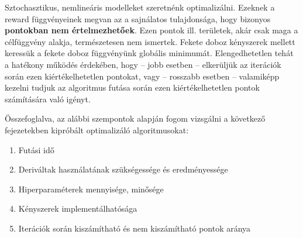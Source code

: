 Sztochasztikus, nemlineáris modelleket szeretnénk optimalizálni. Ezeknek a reward függvényeinek megvan az a sajnálatos tulajdonsága, hogy bizonyos \textbf{pontokban nem értelmezhetőek}. Ezen pontok ill. területek, akár csak maga a célfüggvény alakja, természetesen nem ismertek. Fekete doboz kényszerek mellett keressük a fekete doboz függvényünk globális minimumát. Elengedhetetlen tehát a hatékony működés érdekében, hogy -- jobb esetben -- elkerüljük az iterációk során ezen kiértékelhetetlen pontokat, vagy -- rosszabb esetben -- valamiképp kezelni tudjuk az algoritmus futása során ezen kiértékelhetetlen pontok számítására való igényt.

Összefoglalva, az alábbi szempontok alapján fogom vizsgálni a következő fejezetekben kipróbált optimalizáló algoritmusokat:

\begin{enumerate}
	\item Futási idő
	\item Deriváltak használatának szükségessége és eredményessége
	\item Hiperparaméterek mennyisége, minősége
	\item Kényszerek implementálhatósága
	\item Iterációk során kiszámítható és nem kiszámítható pontok aránya
\end{enumerate}